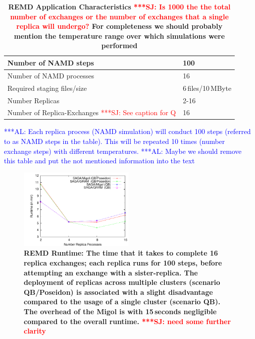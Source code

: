 \documentclass[conference,final]{IEEEtran}
\newcommand{\alnote}[1]{ {\textcolor{blue} { ***AL: #1 }}}
\newcommand{\jhanote}[1]{ {\textcolor{red} { ***SJ: #1 }}}
\newcommand{\alnote}[1]{}
\newcommand{\jhanote}[1]{}
\newcommand{\up}{\vspace*{-1em}}
\begin{document}
\begin{table}        
    \centering
	\begin{tabular}{|p{5cm}|l|}
          \hline
          Number of NAMD steps &100\\ \hline 
          Number of NAMD processes &16\\ \hline 
          Required staging files/size &6\,files/10\,MByte\\ \hline
          Number Replicas &2-16 \\ \hline
          Number of Replica-Exchanges \jhanote{See caption for Q} &16\\ \hline
	\end{tabular}
	\caption{\small \bf REMD Application Characteristics\label{tab:app_stats}
          \jhanote{Is 1000 the the total number of exchanges or the
            number of exchanges that a single replica will undergo?}
          For completeness we should probably mention the temperature
          range over which simulations were performed}
          \alnote{Each replica process (NAMD simulation) will conduct 
          100 steps (referred to as NAMD steps in the table). This 
          will be repeated 10 times (number exchange steps) with 
          different temperatures.}         
          \alnote{Maybe we should remove this table and put the not mentioned information 
          into the text}
          \up\up
\end{table}   

\begin{figure}[htb]
    \centering
    \hspace*{-20pt}
        \includegraphics[width=0.5\textwidth]{performance/perf_remd.pdf}
        \caption{\small \bf REMD Runtime: The time that it
          takes to complete 16 replica exchanges; each replica runs for 100 steps, before attempting an exchange with a
          sister-replica. The deployment of replicas across multiple clusters (scenario QB/Poseidon) is associated 
          with a slight disadvantage compared to the usage of a single cluster (scenario QB).
          The overhead of the Migol is with 15\,seconds negligible compared to the overall runtime. \jhanote{need some further clarity}     
          \up\up}
    \label{fig:performance_perf_runtime}
\end{figure}     
\end{document}
